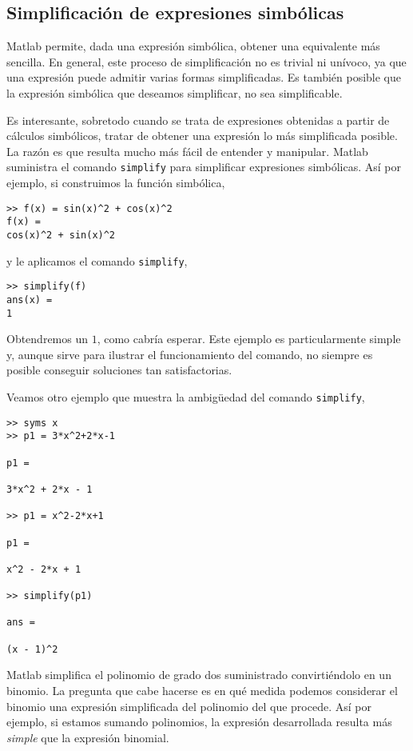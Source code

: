 \subsection{Simplificación de expresiones simbólicas}
Matlab permite, dada una expresión simbólica, obtener una equivalente más sencilla. En general, este proceso de simplificación no es trivial ni unívoco, ya que una expresión puede admitir varias formas simplificadas. Es también posible que la expresión simbólica que deseamos simplificar, no sea simplificable.

Es interesante, sobretodo cuando se trata de expresiones obtenidas a partir de cálculos simbólicos, tratar de obtener una expresión lo más simplificada posible. La razón es que resulta mucho más fácil de entender y manipular. Matlab suministra el comando \texttt{simplify} para simplificar expresiones simbólicas. Así por ejemplo, si construimos la función simbólica,

\begin{verbatim}
>> f(x) = sin(x)^2 + cos(x)^2 
f(x) = 
cos(x)^2 + sin(x)^2
\end{verbatim} 

y le aplicamos el comando \texttt{simplify},
\begin{verbatim}
>> simplify(f)
ans(x) =
1
\end{verbatim}
Obtendremos un $1$, como cabría esperar. Este ejemplo es particularmente simple y, aunque sirve para ilustrar el funcionamiento del comando, no siempre es posible conseguir soluciones tan satisfactorias.

Veamos otro ejemplo que muestra la ambigüedad del comando \texttt{simplify},

\begin{verbatim}
>> syms x
>> p1 = 3*x^2+2*x-1
 
p1 =
 
3*x^2 + 2*x - 1
 
>> p1 = x^2-2*x+1
 
p1 =
 
x^2 - 2*x + 1
 
>> simplify(p1)
 
ans =
 
(x - 1)^2
\end{verbatim}

Matlab simplifica el polinomio de grado dos suministrado convirtiéndolo en un binomio. La pregunta que cabe hacerse es en qué medida podemos considerar el binomio una expresión simplificada del polinomio del que procede. Así por ejemplo, si estamos sumando polinomios, la expresión desarrollada resulta más \emph{simple} que la expresión binomial.


